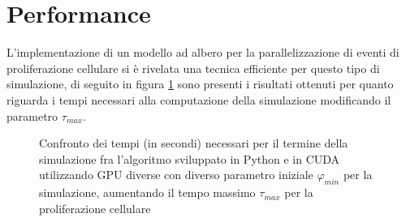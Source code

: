 \section{Performance}

L'implementazione di un modello ad albero per la parallelizzazione di eventi
di proliferazione cellulare si è rivelata una tecnica efficiente per questo
tipo di simulazione, di seguito in figura \ref{chart:performance-results}
sono presenti i risultati ottenuti per
quanto riguarda i tempi necessari alla computazione della simulazione
modificando il parametro $\tau_{max}$.
\\
\begin{figure}[H]
    \begin{minipage}[b]{.5\linewidth}
        \centering
    \end{minipage}
    \begin{minipage}[b]{.5\linewidth}
        \centering
    \end{minipage}
    \caption{Confronto dei tempi (in secondi) necessari per il termine
    della simulazione fra l'algoritmo sviluppato in Python
    e in CUDA utilizzando GPU diverse con diverso parametro iniziale
    $\varphi_{min}$ per la simulazione, aumentando il tempo massimo
    $\tau_{max}$ per la proliferazione cellulare}
    \label{chart:performance-results}
\end{figure}

